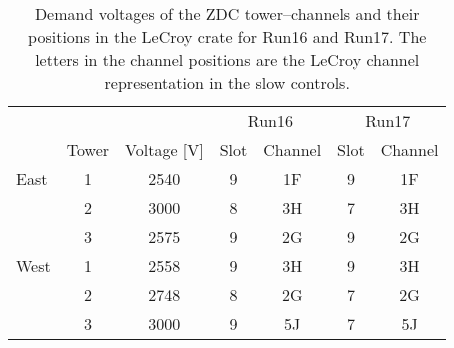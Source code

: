 \begin{table}[htb] 
\caption{\label{HVtable}Demand voltages of the ZDC tower--channels and their positions in the LeCroy crate for Run16 and Run17. The letters in the channel positions are the LeCroy channel representation in the slow controls.}
\label{corected}
\begin{center}
\begin{tabular}{lcccccc}
\toprule
\multicolumn{3}{c}{} &  \multicolumn{2}{c}{Run16} & \multicolumn{2}{c}{Run17} \\
 &Tower&Voltage [V]  &  Slot&Channel  &  Slot&Channel\\
\midrule
East  &1 & 2540 &9&1F&  9&1F\\
      &2 & 3000 &8&3H&  7&3H\\
      &3 & 2575 &9&2G&  9&2G\\
\midrule
West  &1 & 2558 &9&3H&  9&3H \\
      &2 & 2748 &8&2G&  7&2G \\
      &3 & 3000 &9&5J&  7&5J \\
\bottomrule
\end{tabular}
\end{center}
\end{table}
